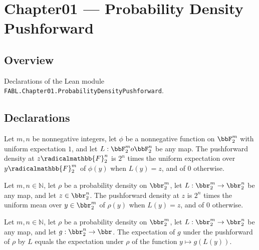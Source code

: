 \chapter{Chapter01 — Probability Density Pushforward}
\section{Overview}

Declarations of the Lean module \texttt{FABL.Chapter01.ProbabilityDensityPushforward}.

\section{Declarations}

\begin{definition}
\label{FABL.ProbabilityDensity.pushforward}
\leanok
{}
Let $m,n$ be nonnegative integers, let $\phi$ be a nonnegative function on $\bbF_2^m$
with uniform expectation $1$, and let $L:\bbF_2^m	o\bbF_2^n$ be any map. The pushforward
density at $z\radicalmathbb{F}_2^n$ is $2^n$ times the uniform expectation over
$y\radicalmathbb{F}_2^m$ of $\phi(y)$ when $L(y)=z$, and of $0$ otherwise.
\end{definition}

\begin{theorem}
\label{FABL.ProbabilityDensity.pushforward_apply}
\leanok
{}
Let $m,n\in\mathbb N$, let $\rho$ be a probability density on $\bbr_2^m$, let
$L:\bbr_2^m\to\bbr_2^n$ be any map, and let $z\in\bbr_2^n$. The pushforward density at
$z$ is $2^n$ times the uniform mean over $y\in\bbr_2^m$ of $\rho(y)$ when $L(y)=z$, and
of $0$ otherwise.
\end{theorem}

\begin{theorem}
\label{FABL.ProbabilityDensity.pushforward_expectation}
\leanok
{}
Let $m,n\in\mathbb N$, let $\rho$ be a probability density on $\bbr_2^m$, let
$L:\bbr_2^m\to\bbr_2^n$ be any map, and let $g:\bbr_2^n\to\bbr$. The expectation of $g$
under the pushforward of $\rho$ by $L$ equals the expectation under $\rho$ of the
function $y\mapsto g(L(y))$.
\end{theorem}

